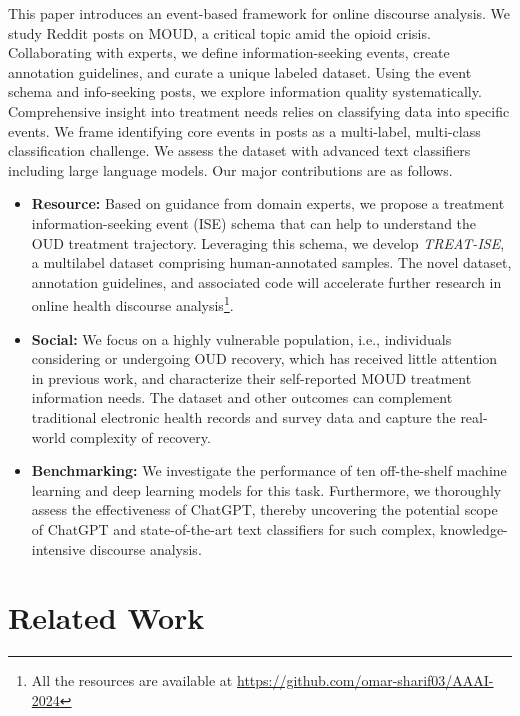 \documentclass[letterpaper]{article} %
\begin{document}
This paper introduces an event-based framework for online discourse analysis. We study Reddit posts on MOUD, a critical topic amid the opioid crisis. Collaborating with experts, we define information-seeking events, create annotation guidelines, and curate a unique labeled dataset. Using the event schema and info-seeking posts, we explore information quality systematically. Comprehensive insight into treatment needs relies on classifying data into specific events. We frame identifying core events in posts as a multi-label, multi-class classification challenge. We assess the dataset with advanced text classifiers including large language models.
Our major contributions are as follows.
\begin{itemize}
   
    \item \textbf{Resource:} Based on guidance from domain experts, we propose a treatment information-seeking event (ISE) schema that can help to understand the OUD treatment trajectory. Leveraging this schema, we develop \textit{TREAT-ISE}, a multilabel dataset comprising human-annotated samples. The novel dataset, annotation guidelines, and associated code will accelerate further research in online health discourse analysis\footnote{All the resources are available at \url{https://github.com/omar-sharif03/AAAI-2024}}. 

     \item \textbf{Social:} We focus on a highly vulnerable population, i.e., individuals considering or undergoing OUD recovery, which has received little attention in previous work, and characterize their self-reported MOUD treatment information needs. The dataset and other outcomes can complement traditional electronic health records and survey data and capture the real-world complexity of recovery. 
    \item \textbf{Benchmarking:} We investigate the performance of ten off-the-shelf machine learning and deep learning models for this task. Furthermore, we thoroughly assess the effectiveness of ChatGPT, thereby uncovering the potential scope of ChatGPT and state-of-the-art text classifiers for such complex, knowledge-intensive discourse analysis. 
\end{itemize}

\section{Related Work}
\end{document}
